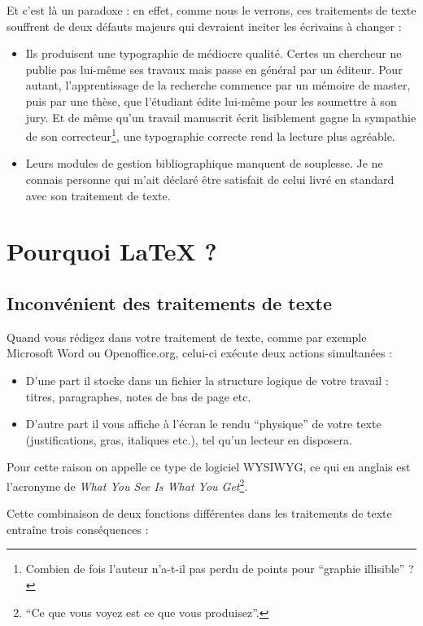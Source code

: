 Et c'est là un paradoxe : en effet, comme nous le verrons, ces traitements de texte souffrent de deux défauts majeurs qui devraient inciter les écrivains à changer :
\begin{itemize}
\item Ils produisent une typographie de médiocre qualité. Certes un chercheur ne publie pas lui-même ses travaux mais passe en général par un éditeur. Pour autant, l'apprentissage de la recherche commence par un mémoire de master, puis par une thèse, que l'étudiant édite lui-même pour les soumettre à son jury. Et de même qu'un travail manuscrit écrit lisiblement gagne la sympathie de son correcteur\footnote{Combien de fois l'auteur n'a-t-il pas perdu de points pour \enquote{graphie illisible} ?},  une typographie correcte rend la lecture plus agréable.
\item Leurs modules de gestion bibliographique manquent de souplesse. Je ne connais personne qui m'ait déclaré être satisfait de celui livré en standard avec son traitement de texte.
\end{itemize}

\section{Pourquoi \LaTeX{} ?}

\subsection{Inconvénient des traitements de texte}

Quand vous rédigez dans votre traitement de texte, comme par exemple Microsoft Word ou Openoffice.org, celui-ci exécute deux actions simultanées :

\begin{itemize}
\item D'une part il stocke dans un fichier la structure logique de votre travail : titres, paragraphes, notes de bas de page etc.
\item D'autre part il vous affiche à l'écran le rendu \enquote{physique} de votre texte (justifications, gras, italiques etc.), tel qu'un lecteur en disposera.
\end{itemize}

Pour cette raison on appelle ce type de logiciel WYSIWYG, ce qui en anglais est l'acronyme de  \textenglish{\emph{What You See Is What You Get}}\footnote{\enquote{Ce que vous voyez est ce que vous produisez}.}. 

Cette combinaison de deux fonctions différentes dans les  traitements de texte entraîne trois conséquences :

